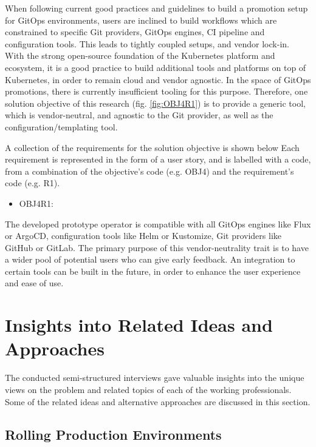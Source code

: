When following current good practices and guidelines
to build a promotion setup for GitOps environments,
users are inclined to build workflows which are constrained to specific Git providers, GitOps engines,
CI pipeline and configuration tools. This leads to tightly coupled setups,
and vendor lock-in.
With the strong open-source foundation of the Kubernetes platform and ecosystem,
it is a good practice to build additional tools and platforms on top of Kubernetes,
in order to remain cloud and vendor agnostic. In the space of GitOps promotions,
there is currently insufficient tooling for this purpose.
Therefore, one solution objective of this research (fig. \ref{fig:OBJ4R1}) is to
provide a generic tool,
which is vendor-neutral,
and agnostic to the Git provider, as well as the configuration/templating tool.

A collection of the requirements for the solution objective is shown below
Each requirement is represented in the form of a user story,
and is labelled with a code, from a combination of the
objective's code (e.g. OBJ4) and the requirement's code (e.g. R1).

\begin{itemize}
	\item OBJ4R1: 
\end{itemize}

The developed prototype operator is compatible with all GitOps engines
like Flux or ArgoCD, configuration tools like Helm or Kustomize,
Git providers like GitHub or GitLab.
The primary purpose of this vendor-neutrality trait is to
have a wider pool of potential users who can give early feedback.
An integration to certain tools can be built in the future, in order to enhance the user experience and ease of use.






\section{Insights into Related Ideas and Approaches}
\label{insights-related-ideas-approaches}

The conducted semi-structured interviews gave valuable insights into
the unique views on the problem and related topics of each of the working professionals.
Some of the related ideas and alternative approaches are discussed in this section.

\subsection*{Rolling Production Environments}

